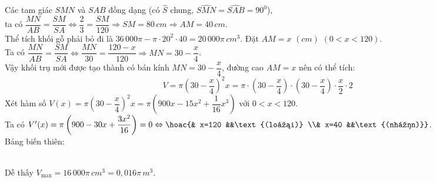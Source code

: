\begin{ex}
{\begin{itemchoice}
         Các tam giác $SMN$ và $SAB$ đồng dạng (có $\widehat{S}$ chung, $\widehat{SMN}=\widehat{SAB}=90^0$),\\
         ta có $\dfrac{MN}{AB}=\dfrac{SM}{SA}\Leftrightarrow \dfrac{2}{3}=\dfrac{SM}{120}\Rightarrow SM=80\,cm\Rightarrow AM=40\,cm$.\\
         Thể tích khối gỗ phải bỏ đi là $36\,000\pi -\pi \cdot 20^2\cdot 40=20\,000\pi \,cm^3$.
         \itemch Đặt $AM=x\,\,(cm)$ $(0<x<120)$. \\
         Ta có $\dfrac{MN}{AB}=\dfrac{SM}{SA}\Leftrightarrow \dfrac{MN}{30}=\dfrac{120-x}{120}\Rightarrow MN=30-\dfrac{x}{4}$.\\
         Vậy khối trụ mới được tạo thành có bán kính $MN=30-\dfrac{x}{4}$, đường cao $AM=x$ nên có thể tích: 
         $$V=\pi \left(30-\dfrac{x}{4}\right)^2x=\pi \cdot \left(30-\dfrac{x}{4}\right)\cdot \left(30-\dfrac{x}{4}\right)\cdot \dfrac{x}{2}\cdot 2$$
         Xét hàm số $V(x)=\pi \left(30-\dfrac{x}{4}\right)^2x=\pi \left(900x-15x^2+\dfrac{1}{16}x^3\right)$  với $0<x<120$.\\
         Ta có $V'(x)=\pi \left(900-30x+\dfrac{3x^2}{16}\right)=0 \Leftrightarrow \hoac{& x=120 &&\text{(loại)} \\& x=40 &&\text{(nhận)}}$.\\
         Bảng biến thiên:\\
         \\
         Dễ thấy $V_{\max}=16\,000\pi \,cm^3=0{,}016\pi \,m^3$.
     \end{itemchoice}
 }
\end{ex}
